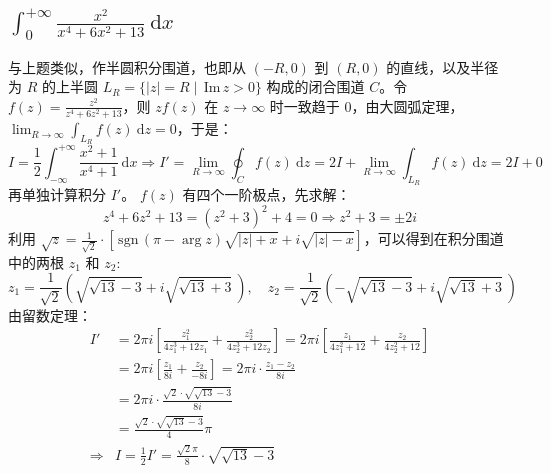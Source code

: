 \documentclass[UTF8]{report}
\def\Im{\mathrm{\,Im\,}}
\def\sgn{\mathrm{\,sgn\,}}
\theoremstyle{MyLineTheoremStyle} %
\theoremstyle{MyBlockTheoremStyle} %
\theoremstyle{MySubsubsectionStyle} %
\begin{document}
\subsection{$\displaystyle \int_{0}^{+\infty}  \frac{x^2}{x^4 + 6x^2 + 13}  \ \mathrm{d}x$}
与上题类似，作半圆积分围道，也即从 $(-R, 0)$ 到 $(R, 0)$ 的直线，以及半径为 $R$ 的上半圆 $L_R = \{| z | = R \mid \Im z > 0\}$ 构成的闭合围道 $C$。令 $f(z) = \frac{z^2}{z^4 + 6z^2 + 13}$，则 $zf(z)$ 在 $z \to \infty$ 时一致趋于 0，由大圆弧定理，$\lim_{R \to \infty}\int_{L_R} f(z) \ \mathrm{d}z = 0$，于是：
\begin{equation}
    I = \frac{1}{2} \int_{-\infty}^{+\infty}\frac{x^2 + 1}{x^4 + 1}\ \mathrm{d}x
    \Longrightarrow 
    I' = \lim_{R \to \infty}\oint_{C} f(z) \ \mathrm{d}z = 
    2 I + \lim_{R \to \infty}\int_{L_R} f(z) \ \mathrm{d}z
    = 2I + 0
\end{equation}
再单独计算积分 $I'$。
$f(z)$ 有四个一阶极点，先求解：
\begin{equation}
    z^4 + 6z^2 + 13 = \left(z^2 + 3\right)^2 + 4 = 0 \Longrightarrow z^2 + 3 = \pm 2 i
\end{equation}
利用 $\sqrt{z} = \frac{1}{\sqrt{2}}\cdot \left[ \sgn (\pi - \arg z) \sqrt{| z | + x} + i \sqrt{| z | - x} \right]$，可以得到在积分围道中的两根 $z_1$ 和 $z_2$:
\begin{equation}
    z_1 = \frac{1}{\sqrt{2}} \left( \sqrt{\sqrt{13} - 3} + i \sqrt{\sqrt{13} + 3}^{\ } \right),\quad z_2 = \frac{1}{\sqrt{2}} \left( -\sqrt{\sqrt{13} - 3} + i \sqrt{\sqrt{13} + 3}^{\ } \right)
\end{equation}
由留数定理：
\begin{align}
I' 
&= 2\pi i \left[ \frac{z_1^2}{4z_1^3 + 12z_1} + \frac{z_2^2}{4z_2^3 + 12z_2} \right] 
= 2\pi i \left[ \frac{z_1}{4z_1^2 + 12} + \frac{z_2}{4z_2^2 + 12}\right] \\ 
&= 2\pi i \left[ \frac{z_1}{8i} + \frac{z_2}{-8i} \right]
= 2\pi i \cdot \frac{z_1 - z_2}{8i} \\
&= 2\pi i \cdot \frac{\sqrt{2} \cdot \sqrt{\sqrt{13} - 3}}{8i} \\
&= \frac{\sqrt{2}\cdot\sqrt{\sqrt{13} - 3}}{4}\pi \\
\Longrightarrow & \boxed{I = \frac{1}{2}I' = \frac{\sqrt{2}\pi}{8} \cdot \sqrt{\sqrt{13} - 3}} 
\end{align}
\end{document}
